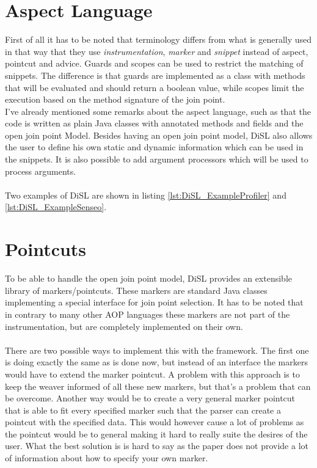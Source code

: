 \documentclass[a4paper]{report}
\begin{document}
\section{Aspect Language}
First of all it has to be noted that terminology differs from what is generally used in that way that they use \textit{instrumentation}, \textit{marker} and \textit{snippet} instead of aspect, pointcut and advice. Guards and scopes can be used to restrict the matching of snippets. The difference is that guards are implemented as a class with methods that will be evaluated and should return a boolean value, while scopes limit the execution based on the method signature of the join point.
\\
I've already mentioned some remarks about the aspect language, such as that the code is written as plain Java classes with annotated methods and fields and the open join point Model. Besides having an open join point model, DiSL also allows the user to define his own static and dynamic information which can be used in the snippets. It is also possible to add argument processors which will be used to process arguments.\\
\\
Two examples of DiSL are shown in listing \ref{lst:DiSL_ExampleProfiler} and \ref{lst:DiSL_ExampleSenseo}.

\section{Pointcuts}
To be able to handle the open join point model, DiSL provides an extensible library of markers/pointcuts. These markers are standard Java classes implementing a special interface for join point selection. It has to be noted that in contrary to many other AOP languages these markers are not part of the instrumentation, but are completely implemented on their own.\\
\\
There are two possible ways to implement this with the framework. The first one is doing exactly the same as is done now, but instead of an interface the markers would have to extend the marker pointcut. A problem with this approach is to keep the weaver informed of all these new markers, but that's a problem that can be overcome. Another way would be to create a very general marker pointcut that is able to fit every specified marker such that the parser can create a pointcut with the specified data. This would however cause a lot of problems as the pointcut would be to general making it hard to really suite the desires of the user. What the best solution is is hard to say as the paper does not provide a lot of information about how to specify your own marker.
\end{document}
